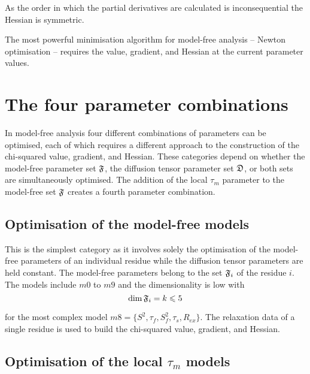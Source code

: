 \noindent As the order in which the partial derivatives are calculated is inconsequential the Hessian is symmetric.

The most powerful minimisation algorithm for model-free analysis -- Newton optimisation -- requires the value, gradient, and Hessian at the current parameter values.




\section{The four parameter combinations}

In model-free analysis four different combinations of parameters can be optimised, each of which requires a different approach to the construction of the chi-squared value, gradient, and Hessian.  These categories depend on whether the model-free parameter set $\mathfrak{F}$, the diffusion tensor parameter set $\mathfrak{D}$, or both sets are simultaneously optimised.  The addition of the local $\tau_m$ parameter to the model-free set $\mathfrak{F}$ creates a fourth parameter combination.





\subsection{Optimisation of the model-free models}

This is the simplest category as it involves solely the optimisation of the model-free parameters of an individual residue while the diffusion tensor parameters are held constant.  The model-free parameters belong to the set $\mathfrak{F}_i$ of the residue $i$.  The models include $m0$ to $m9$ and the dimensionality is low with
\begin{equation}
    \dim \mathfrak{F}_i = k \leqslant 5
\end{equation}

\noindent for the most complex model $m8 = \{S^2, \tau_f, S^2_f, \tau_s, R_{ex}\}$.  The relaxation data of a single residue is used to build the chi-squared value, gradient, and Hessian.



\subsection{Optimisation of the local $\tau_m$ models}

